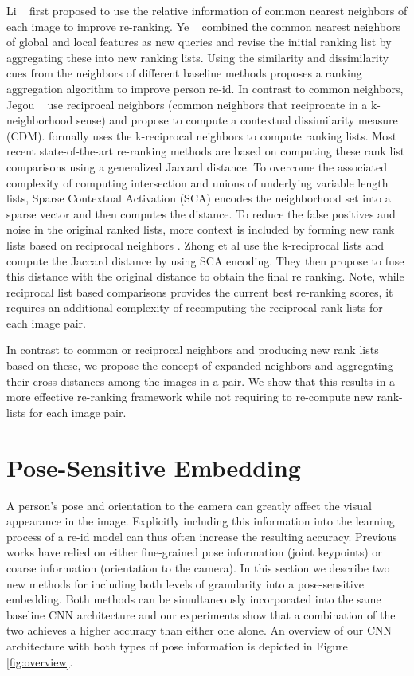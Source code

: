 \documentclass[10pt,twocolumn,letterpaper]{article}
\begin{document}
Li \etal~\cite{li2012common} first proposed to use the relative information of common nearest neighbors of each image to improve re-ranking. Ye \etal~\cite{ye2015coupled} combined the common nearest neighbors of global and local features as new queries and revise the initial ranking list by aggregating these into new ranking lists. Using the similarity and dissimilarity cues from the neighbors of different baseline methods \cite{ye2016person} proposes a ranking aggregation algorithm to improve person re-id.
In contrast to common neighbors, Jegou \etal~\cite{jegou2007contextual}  use reciprocal neighbors (\ie common neighbors that reciprocate in a k-neighborhood sense) and propose to compute a contextual dissimilarity measure (CDM). \cite{qin2011hello} formally uses the k-reciprocal neighbors to compute ranking lists. Most recent state-of-the-art re-ranking methods are based on computing these rank list comparisons using a generalized Jaccard distance.
To overcome the associated complexity of computing intersection and unions of underlying variable length lists, Sparse Contextual Activation (SCA) \cite{bai2016sparse} encodes the neighborhood set into a sparse vector and then computes the distance. To reduce the false positives and noise in the original ranked lists, more context is included by forming new rank lists based on reciprocal neighbors \cite{jegou2007contextual}\cite{qin2011hello}\cite{zhong2017re}. Zhong et al \cite{zhong2017re} use the k-reciprocal lists and compute the Jaccard distance by using SCA encoding. They then propose to fuse this distance with the original distance to obtain the final re ranking. Note, while reciprocal list based comparisons provides the current best re-ranking scores, it requires an additional complexity of recomputing the reciprocal rank lists for each image pair.

In contrast to common or reciprocal neighbors and producing new rank lists based on these, we propose the concept of expanded neighbors and aggregating their cross distances among the images in a pair. We show that this results in a more effective re-ranking framework while not requiring to re-compute new rank-lists for each image pair.
 \section{Pose-Sensitive Embedding}
\label{sec:embedding}
A person's pose and orientation to the camera can greatly affect the visual appearance in the image.
Explicitly including this information into the learning process of a re-id model can thus
often increase the resulting accuracy. Previous works have relied on either fine-grained pose 
information (\eg joint keypoints) or coarse information (\eg orientation to the camera). In this 
section we describe two new methods for including both levels of granularity into a pose-sensitive
embedding. Both methods can be simultaneously incorporated into the same baseline CNN architecture and our experiments show that a combination of the two achieves a higher accuracy than 
either one alone. An overview of our CNN architecture with both types of pose information is 
depicted in Figure \ref{fig:overview}.
\end{document}
